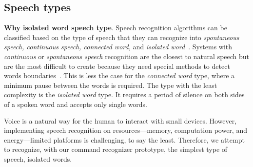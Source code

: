 

\subsection {Speech types}
%
\noindent\textbf{Why isolated word speech type}. Speech recognition algorithms can be classified based on the type of speech that they can recognize into \textit{spontaneous speech, continuous speech, connected word,} and \textit{isolated word}~\cite{gaikwad2010review}.
Systems with \textit{continuous} or \textit{spontaneous speech} recognition are the closest to natural speech but are the most difficult to create because they need special methods to detect words boundaries~\cite{gaikwad2010review}. This is less the case for the \textit{connected word} type, where a minimum pause between the words is required. The type with the least complexity is the \textit{isolated word} type. It requires a period of silence on both sides of a spoken word and accepts only single words. 
 
Voice is a natural way for the human to interact with small devices. However,
implementing speech recognition on resources---memory, computation power, and energy---limited platforms is challenging, to say the least. Therefore, we attempt to recognize, with our command recognizer prototype, the simplest type of speech, isolated words. 